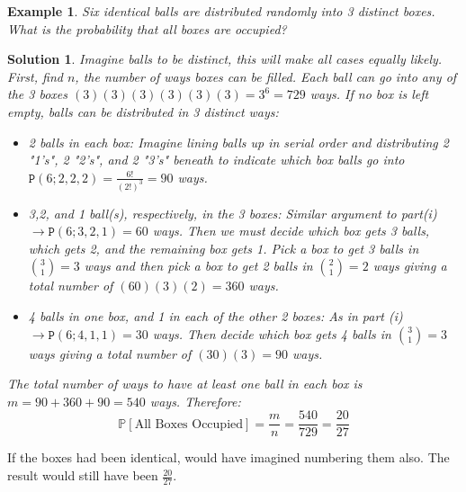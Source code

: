 \documentclass[12pt, letterpaper, onecolumn, conference, final]{IEEEtran}
\theoremstyle{definition}
\theoremstyle{plain}
\newtheorem{example}{Example}[section]
\newtheorem{solution}{Solution}[section]
\begin{document}
\begin{example}
Six identical balls are distributed randomly into 3 distinct boxes. What is the probability that all boxes are occupied?
\end{example}
\begin{solution}
Imagine balls to be distinct, this will make all cases equally likely. First, find $n$, the number of ways boxes can be filled. Each ball can go into any of the 3 boxes $(3)(3)(3)(3)(3)(3) = 3^6 = 729$ ways. If no box is left empty, balls can be distributed in 3 distinct ways:
\begin{itemize}

\vspace{.2cm}
\item[(i)]
2 balls in each box: Imagine lining balls up in serial order and distributing 2 "1's", 2 "2's", and 2 "3's" beneath to indicate which box balls go into $\mathtt{P}(6;2,2,2) = \frac{6!}{(2!)^3} = 90$ ways.

\vspace{.2cm}
\item[(ii)]
3,2, and 1 ball(s), respectively, in the 3 boxes: Similar argument to part(i) $\rightarrow \mathtt{P}(6;3,2,1) = 60$ ways. Then we must decide which box gets 3 balls, which gets 2, and the remaining box gets 1. Pick a box to get 3 balls in ${3 \choose 1} = 3$ ways and then pick a box to get 2 balls in ${2 \choose 1} = 2$ ways giving a total number of $(60)(3)(2) = 360$ ways.

\vspace{.2cm}
\item[(iii)]
4 balls in one box, and 1 in each of the other 2 boxes: As in part (i) $\rightarrow \mathtt{P}(6;4,1,1) = 30$ ways. Then decide which box gets 4 balls in ${3 \choose 1} = 3$ ways giving a total number of $(30)(3) = 90$ ways.

\end{itemize}
The total number of ways to have at least one ball in each box is $m=90+360+90=540$ ways. Therefore:
\begin{equation*}
\mathbb{P}[\text{All Boxes Occupied}] = \frac{m}{n} = \frac{540}{729} = \frac{20}{27}
\end{equation*}
\end{solution}

\noindent
If the boxes had been identical, would have imagined numbering them also. The result would still have been $\frac{20}{27}$.
\end{document}
